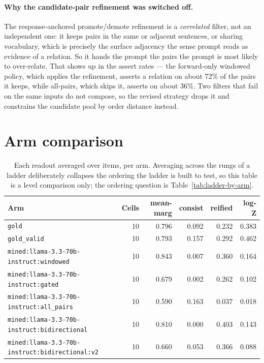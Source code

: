 \documentclass[11pt]{article}
\begin{document}
\paragraph{Why the candidate-pair refinement was switched off.} The response-anchored promote/demote refinement is a \emph{correlated} filter, not an independent one: it keeps pairs in the same or adjacent sentences, or sharing vocabulary, which is precisely the surface adjacency the sense prompt reads as evidence of a relation. So it hands the prompt the pairs the prompt is most likely to over-relate. That shows up in the assert rates --- the forward-only windowed policy, which applies the refinement, asserts a relation on about 72\% of the pairs it keeps, while all-pairs, which skips it, asserts on about 36\%. Two filters that fail on the same inputs do not compose, so the revised strategy drops it and constrains the candidate pool by order distance instead.

\section{Arm comparison}\label{sec:arms}

\begin{table}[htbp]
\centering
\small
\caption{Each readout averaged over items, per arm. Averaging across the rungs of a ladder deliberately collapses the ordering the ladder is built to test, so this table is a level comparison only; the ordering question is Table~\ref{tab:ladder-by-arm}.}
\label{tab:policy-lcs}
\begin{tabular}{lrrrrr}
\toprule
Arm & Cells & \textbf{mean-marg} & \textbf{consist} & \textbf{reified} & \textbf{log-Z} \\
\midrule
\texttt{gold} & 10 & 0.796 & 0.092 & 0.232 & 0.383 \\
\texttt{gold\_valid} & 10 & 0.793 & 0.157 & 0.292 & 0.462 \\
\texttt{mined:llama-3.3-70b-instruct:windowed} & 10 & 0.843 & 0.007 & 0.360 & 0.164 \\
\texttt{mined:llama-3.3-70b-instruct:gated} & 10 & 0.679 & 0.002 & 0.262 & 0.102 \\
\texttt{mined:llama-3.3-70b-instruct:all\_pairs} & 10 & 0.590 & 0.163 & 0.037 & 0.018 \\
\texttt{mined:llama-3.3-70b-instruct:bidirectional} & 10 & 0.810 & 0.000 & 0.403 & 0.143 \\
\texttt{mined:llama-3.3-70b-instruct:bidirectional:v2} & 10 & 0.660 & 0.053 & 0.366 & 0.088 \\
\bottomrule
\end{tabular}
\end{table}
\end{document}
